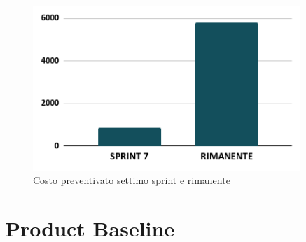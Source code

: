 \begin{figure}[h!]
    \centering
    \includegraphics[width=0.9\textwidth]{prev7costo.png}
    \caption{Costo preventivato settimo sprint e rimanente}
    \label{fig:preventivocostosettimosprint}
\end{figure}



\newpage
\section{Product Baseline}

\newpage

